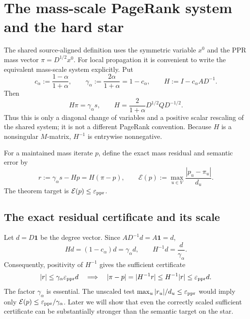\section{The mass-scale PageRank system and the hard star}
\label{sec:signed-star-model}

The shared source-aligned definition uses the symmetric variable $x^0$ and
the PPR mass vector $\pi=D^{1/2}x^0$.  For local propagation it is convenient
to write the equivalent mass-scale system explicitly.  Put
\begin{equation}
  c_\alpha:=\frac{1-\alpha}{1+\alpha},
  \qquad
  \gamma_\alpha:=\frac{2\alpha}{1+\alpha}=1-c_\alpha,
  \qquad
  H:=I-c_\alpha AD^{-1}.
  \label{eq:signed-star-mass-operator}
\end{equation}
Then
\begin{equation}
  H\pi=\gamma_\alpha s,
  \qquad
  H=\frac{2}{1+\alpha}
      D^{1/2}QD^{-1/2}.
  \label{eq:signed-star-mapping}
\end{equation}
Thus this is only a diagonal change of variables and a positive scalar
rescaling of the shared system; it is not a different PageRank convention.
Because $H$ is a nonsingular $M$-matrix, $H^{-1}$ is entrywise nonnegative.

For a maintained mass iterate $p$, define the exact mass residual and semantic
error by
\begin{equation}
  r:=\gamma_\alpha s-Hp=H(\pi-p),
  \qquad
  \mathcal E(p):=\max_{u\in V}
      \frac{|p_u-\pi_u|}{d_u}.
  \label{eq:signed-star-residual-error}
\end{equation}
The theorem target is $\mathcal E(p)\le\varepsilon_{\rm ppr}$.

\subsection{The exact residual certificate and its scale}

Let $d=D\mathbf 1$ be the degree vector.  Since
$AD^{-1}d=A\mathbf1=d$,
\begin{equation}
  Hd=(1-c_\alpha)d=\gamma_\alpha d,
  \qquad
  H^{-1}d=\frac{d}{\gamma_\alpha}.
  \label{eq:signed-star-degree-eigenvector}
\end{equation}
Consequently, positivity of $H^{-1}$ gives the sufficient certificate
\begin{equation}
  |r|\le\gamma_\alpha\varepsilon_{\rm ppr}d
  \quad\Longrightarrow\quad
  |\pi-p|=|H^{-1}r|
  \le H^{-1}|r|
  \le\varepsilon_{\rm ppr}d.
  \label{eq:signed-star-certificate}
\end{equation}
The factor $\gamma_\alpha$ is essential.  The unscaled test
$\max_u|r_u|/d_u\le\varepsilon_{\rm ppr}$ would imply only
$\mathcal E(p)\le\varepsilon_{\rm ppr}/\gamma_\alpha$.  Later we will show
that even the correctly scaled sufficient certificate can be substantially
stronger than the semantic target on the star.

